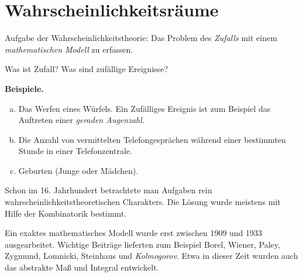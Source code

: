 \section{Wahrscheinlichkeitsräume}

Aufgabe der Wahrscheinlichkeitstheorie: Das Problem des \emph{Zufalls} mit einem
\emph{mathematischen Modell} zu erfassen.

Was ist Zufall? Was sind zufällige Ereignisse?

\textbf{Beispiele.}
\begin{enumerate}[a)]
\item Das Werfen eines Würfels. Ein Zufälliges Ereignis ist zum Beispiel das
  Auftreten einer \emph{geraden Augenzahl}.
\item Die Anzahl von vermittelten Telefongesprächen während einer bestimmten
  Stunde in einer Telefonzentrale.
\item Geburten (Junge oder Mädchen).
\end{enumerate}

Schon im 16. Jahrhundert betrachtete man Aufgaben rein
wahrscheinlichkeitstheoretischen Charakters. Die Lösung wurde meistens mit Hilfe
der Kombinatorik bestimmt.

Ein exaktes mathematisches Modell wurde erst zwischen 1909 und 1933
ausgearbeitet. Wichtige Beiträge lieferten zum Beispiel Borel, Wiener, Paley,
Zygmund, Lomnicki, Steinhaus und \emph{Kolmogorov}. Etwa in dieser Zeit wurden
auch das abstrakte Maß und Integral entwickelt.

